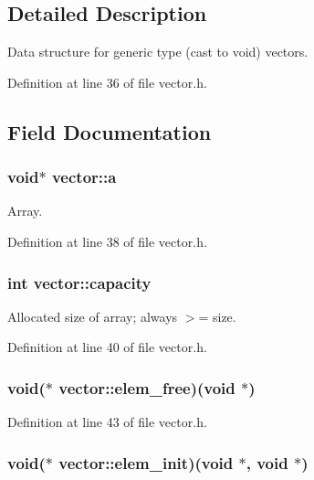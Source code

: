 \subsection{Detailed Description}
Data structure for generic type (cast to void) vectors. 

Definition at line 36 of file vector.h.



\subsection{Field Documentation}
\hypertarget{structvector_ab7be2d9a85f6fa18178475cf04f04024}{
\subsubsection[{a}]{\setlength{\rightskip}{0pt plus 5cm}void$\ast$ {\bf vector::a}}}
\label{structvector_ab7be2d9a85f6fa18178475cf04f04024}


Array. 



Definition at line 38 of file vector.h.

\hypertarget{structvector_a95bc684a8044cfc0e509861448908bf2}{
\subsubsection[{capacity}]{\setlength{\rightskip}{0pt plus 5cm}int {\bf vector::capacity}}}
\label{structvector_a95bc684a8044cfc0e509861448908bf2}


Allocated size of array; always $>$= size. 



Definition at line 40 of file vector.h.

\hypertarget{structvector_aa707fd886c386fe365b6d6dbadb49733}{
\subsubsection[{elem\_\-free}]{\setlength{\rightskip}{0pt plus 5cm}void($\ast$ {\bf vector::elem\_\-free})(void $\ast$)}}
\label{structvector_aa707fd886c386fe365b6d6dbadb49733}


Definition at line 43 of file vector.h.

\hypertarget{structvector_a9aa1b736be034d1734173299ba7874e2}{
\subsubsection[{elem\_\-init}]{\setlength{\rightskip}{0pt plus 5cm}void($\ast$ {\bf vector::elem\_\-init})(void $\ast$, void $\ast$)}}
\label{structvector_a9aa1b736be034d1734173299ba7874e2}


